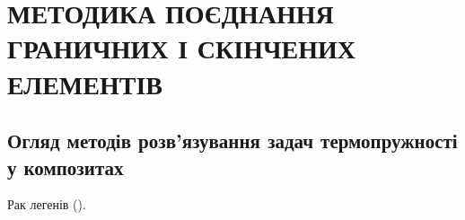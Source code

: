 \chapter{МЕТОДИКА ПОЄДНАННЯ ГРАНИЧНИХ І СКІНЧЕНИХ ЕЛЕМЕНТІВ}

\nocite{bahvalov-et-al,benerdge-et-al,lung-cancer} 

\section{Огляд методів розв'язування задач термопружності у композитах}

Рак легенів (\cite{lung-cancer}).
